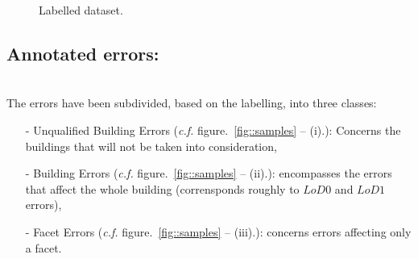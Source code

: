 \documentclass[a4paper, 11pt]{article}
\begin{document}
	\begin{figure}[H]
		{
			\caption{\label{fig::dataset} Labelled dataset.}
		}
	\end{figure}

	\subsection{Annotated errors:}
~\\


	The errors have been subdivided, based on the labelling, into three classes:

	\begin{itemize}
		\item[-] Unqualified Building Errors (\textit{c.f.} figure.~\ref{fig::samples} -- (i).): Concerns the buildings that will not
		be taken into consideration,
		\item[-] Building Errors (\textit{c.f.} figure.~\ref{fig::samples} -- (ii).):
		encompasses the errors that affect the whole building (corrensponds roughly to $LoD0$ and $LoD1$ errors),
		\item[-] Facet Errors (\textit{c.f.} figure.~\ref{fig::samples} -- (iii).):
		concerns errors affecting only a facet.
	\end{itemize}
\end{document}
